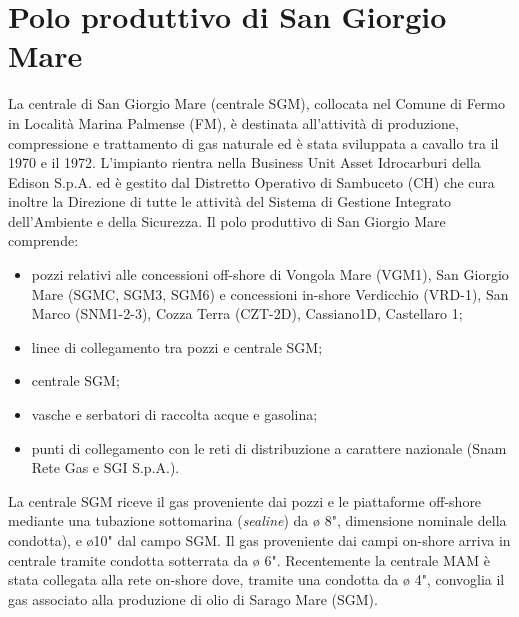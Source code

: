 \section{Polo produttivo di San Giorgio Mare}
La centrale di San Giorgio Mare (centrale SGM), collocata nel Comune di Fermo in Località Marina Palmense (FM), è destinata all'attività di produzione, compressione e trattamento di gas naturale ed è stata sviluppata a cavallo tra il 1970 e il 1972. L'impianto rientra nella Business Unit Asset Idrocarburi della Edison S.p.A. ed è gestito dal Distretto Operativo di Sambuceto (CH) che cura inoltre la Direzione di tutte le attività del Sistema di Gestione Integrato dell'Ambiente e della Sicurezza. Il polo produttivo di San Giorgio Mare comprende:
\begin{itemize}
	\item pozzi relativi alle concessioni off-shore di Vongola Mare (VGM1), San Giorgio Mare (SGMC, SGM3, SGM6) e concessioni in-shore Verdicchio (VRD-1), San Marco (SNM1-2-3), Cozza Terra (CZT-2D), Cassiano1D, Castellaro 1;
	\item linee di collegamento tra pozzi e centrale SGM;
	\item centrale SGM;
	\item vasche e serbatori di raccolta acque e gasolina;
	\item punti di collegamento con le reti di distribuzione a carattere nazionale (Snam Rete Gas e SGI S.p.A.).
\end{itemize}
La centrale SGM riceve il gas proveniente dai pozzi e le piattaforme off-shore mediante una tubazione sottomarina (\textit{sealine}) da ø 8", dimensione nominale della condotta), e ø10" dal campo SGM. Il gas proveniente dai campi on-shore arriva in centrale tramite condotta sotterrata da ø 6". Recentemente la centrale MAM è stata collegata alla rete on-shore dove, tramite una condotta da ø 4", convoglia il gas associato alla produzione  di olio di Sarago Mare (SGM).


